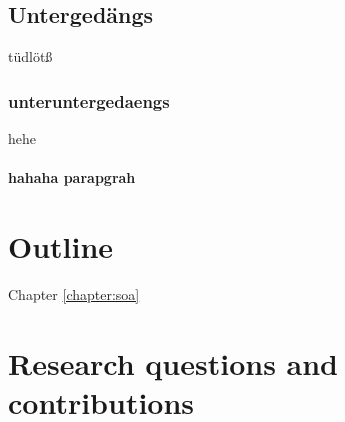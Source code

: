 \subsection{Untergedängs}
tüdlötß
\subsubsection{unteruntergedaengs}
hehe

\paragraph{hahaha parapgrah}

\section{Outline}

Chapter \ref{chapter:soa} 

\section{Research questions and contributions}
\label{sec:introduction:contributions}

\newpage\thispagestyle{empty}